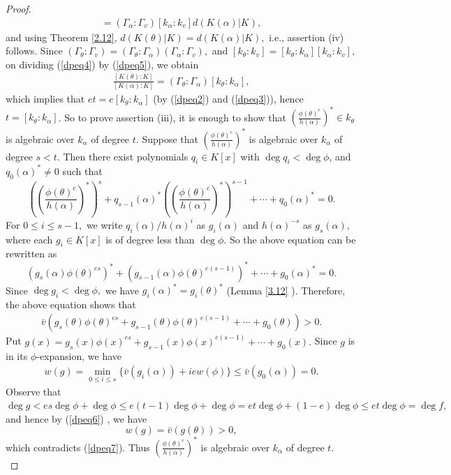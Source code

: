 \documentclass[11pt]{amsart}
\theoremstyle{definition}
\theoremstyle{remark}
\numberwithin{equation}{section}
\begin{document}
\begin{proof}
\begin{align}
	[K(\alpha):K]=(\Gamma_\alpha:\Gamma_v)[k_\alpha:k_v]d(K(\alpha)|K),	
	\end{align}
	and using  Theorem \ref{2.12}, $d(K(\theta)|K)=d(K(\alpha)|K),$ i.e., assertion (iv) follows.
	Since $(\Gamma_\theta:\Gamma_v)=(\Gamma_\theta:\Gamma_\alpha)(\Gamma_\alpha:\Gamma_v),$ and $[k_\theta:k_v]=[k_\theta:k_\alpha][k_\alpha:k_v],$ on dividing (\ref{dpeq4}) by (\ref{dpeq5}), we obtain
	\begin{align*}
		\frac{[K(\theta):K]}{[K(\alpha):K]}=(\Gamma_\theta:\Gamma_\alpha)[k_\theta:k_\alpha],
			\end{align*}
			which implies that $et=e[k_\theta:k_\alpha]$ (by  (\ref{dpeq2}) and (\ref{dpeq3})),
		hence $	t=[k_\theta:k_\alpha]$.
	So to prove assertion (iii), it is enough to show that $\left(\frac{\phi(\theta)^e}{h(\alpha)}\right)^*\in k_\theta$ is algebraic over $k_\alpha$ of degree $t.$ Suppose that $\left(\frac{\phi(\theta)^e}{h(\alpha)}\right)^*$ is algebraic over $k_\alpha$ of degree $s<t.$ Then there exist polynomials $q_i\in K[x]$ with $\deg q_i < \deg \phi$, and $q_0(\alpha)^*\neq 0$ such that
	\[\left(\left(\frac{\phi(\theta)^e}{h(\alpha)}\right)^*\right)^s + q_{s-1}(\alpha)^*\left(\left(\frac{\phi(\theta)^e}{h(\alpha)}\right)^*\right)^{s-1}+\cdots+q_0(\alpha)^*=0.\] For $0\leq i \leq {s-1},$ we write $q_i(\alpha)/h(\alpha)^i$ as $g_i(\alpha)$ and $h(\alpha)^{-s}$ as $g_s(\alpha),$ where each $g_i\in K[x]$ is of degree less than $\deg \phi.$ So the above equation can be rewritten as 
	\[(g_s(\alpha)\phi(\theta)^{es})^*+(g_{s-1}(\alpha)\phi(\theta)^{e{(s-1)}})^*+\cdots+g_0(\alpha)^*=0.\] 
	Since $\deg g_i<\deg \phi,$ we have $g_i(\alpha)^*=g_i(\theta)^*$ (Lemma \ref{3.12} ). Therefore, the above equation shows that
	\begin{align}\label{dpeq6}
		\bar{v}(g_s(\theta)\phi(\theta)^{es}+g_{s-1}(\theta)\phi(\theta)^{e(s-1)}+\cdots +g_0(\theta))>0.\end{align}
	Put $g(x)=g_s(x)\phi(x)^{es}+g_{s-1}(x)\phi(x)^{e(s-1)}+\cdots +g_0(x).$ Since $g$ is in its $\phi$-expansion, we have \begin{align}\label{dpeq7}
			w(g)=\min_{0\leq i \leq s}\{\bar{v}(g_i(\alpha))+iew(\phi)\}\leq \bar{v}(g_0(\alpha))=0.
	\end{align}
		  Observe that $\deg g<es\deg \phi+ \deg \phi\leq e(t-1)\deg \phi+\deg \phi=et\deg \phi+(1-e)\deg \phi\leq et\deg \phi=\deg f,$ and hence by (\ref{dpeq6}) , we have \[w(g)=\bar{v}(g(\theta))>0,\] which contradicts (\ref{dpeq7}). Thus $\left(\frac{\phi(\theta)^e}{h(\alpha)}\right)^*$ is algebraic over $k_\alpha$ of degree $t.$ \\ 
		

\end{proof}
\end{document}
